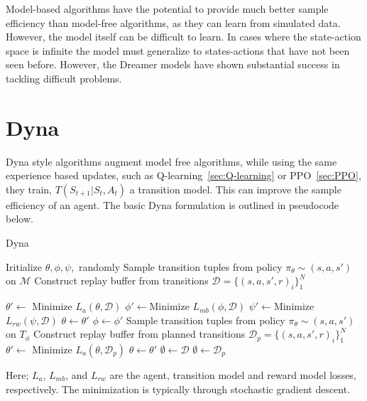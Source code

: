 Model-based algorithms have the potential to provide much better sample efficiency than model-free algorithms, as they can learn from simulated data. However, the model itself can be difficult to learn. In cases where the state-action space is infinite the model must generalize to states-actions that have not been seen before. However, the Dreamer models have shown substantial success in tackling difficult problems\cite{hafner2023mastering, hafner2020mastering}.

\section{Dyna} \label{sec:Dyna}
Dyna style algorithms\cite{sutton2018reinforcement, sutton2012dyna} augment model free algorithms, while using the same experience based updates, such as Q-learning~\ref{sec:Q-learning} or PPO~\ref{sec:PPO}, they train, $T(S_{t+1}|S_t, A_t)$ a transition model. This can improve the sample efficiency of an agent. The basic Dyna formulation is outlined in pseudocode below.
\begin{algorithm}
	\caption{Dyna}
	\begin{algorithmic}
		\State Iritialize $\theta, \phi, \psi,$ randomly
		\State Sample transition tuples from policy $\pi_\theta \sim (s, a, s')$ on $\mathcal{M}$
		\State Construct replay buffer from transitions $\mathcal{D} = \{(s, a, s', r)_i\}_1^N$

		\State $\theta' \leftarrow$ Minimize $L_{a}(\theta, \mathcal{D})$
		\State $\phi' \leftarrow $Minimize $L_{mb}(\phi , \mathcal{D})$
		\State $\psi' \leftarrow $Minimize $L_{rw}(\psi , \mathcal{D})$
		\EndFor
		\State $\theta \leftarrow \theta'$
		\State $\phi \leftarrow \phi'$
		\State Sample transition tuples from policy $\pi_\theta \sim (s, a, s')$ on $T_\phi$
		\State Construct replay buffer from planned transitions $\mathcal{D}_{p} = \{(s, a, s', r)_i\}_1^N$
		\State $\theta' \leftarrow$ Minimize $L_{a}(\theta, \mathcal{D}_p)$
		\EndFor
		\State $\theta \leftarrow \theta'$
		\State $\emptyset \leftarrow \mathcal{D}$
		\State $\emptyset \leftarrow \mathcal{D}_p$
		\EndFor
		\EndFor
	\end{algorithmic}
	\label{algo:Dyna}
\end{algorithm}
Here; $L_{a}$, $L_{mb}$, and $L_{rw}$ are the agent, transition model and reward model losses, respectively. The minimization is typically through stochastic gradient descent.


